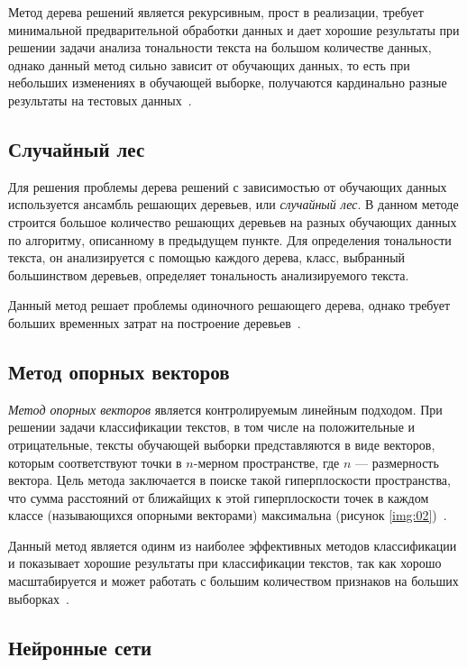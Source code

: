 Метод дерева решений является рекурсивным, прост в реализации, требует
минимальной предварительной обработки данных и дает хорошие результаты при
решении задачи анализа тональности текста на большом количестве данных, однако
данный метод сильно зависит от обучающих данных, то есть при небольших
изменениях в обучающей выборке, получаются кардинально разные результаты на
тестовых данных~\cite{article9}.

\subsection{Случайный лес}

Для решения проблемы дерева решений с зависимостью от обучающих данных
используется ансамбль решающих деревьев, или \textit{случайный лес}.
В данном методе строится большое количество решающих деревьев на разных
обучающих данных по алгоритму, описанному в предыдущем пункте. Для определения
тональности текста, он анализируется с помощью каждого дерева, класс, выбранный
большинством деревьев, определяет тональность анализируемого текста.

Данный метод решает проблемы одиночного решающего дерева, однако требует больших
временных затрат на построение деревьев~\cite{article9}.

\subsection{Метод опорных векторов}

\textit{Метод опорных векторов} является контролируемым линейным подходом. При
решении задачи классификации текстов, в том числе на положительные и
отрицательные, тексты обучающей выборки представляются в виде векторов, которым
соответствуют точки в $n$-мерном пространстве, где $n$ --- размерность вектора.
Цель метода заключается в поиске такой гиперплоскости пространства, что сумма
расстояний от ближайщих к этой гиперплоскости точек в каждом классе
(называющихся опорными векторами) максимальна (рисунок
\ref{img:02})~\cite{article16}.


Данный метод является одинм из наиболее эффективных методов классификации
и показывает хорошие результаты при классификации текстов, так как
хорошо масштабируется и может работать с большим количеством признаков на
больших выборках~\cite{article9}.

\subsection{Нейронные сети}


